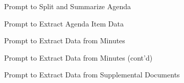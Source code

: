 \documentclass[12pt,english,hyperfootnotes=false,hidelinks]{article}
\begin{document}
\makeatletter
{}
\makeatother



\pagebreak

\begin{figure}[H]
\caption{Prompt to Split and Summarize Agenda} \label{fig_split_agenda_prompt}
\vspace{-0.5cm}
\begin{center}
\fbox{
\begin{minipage}{\textwidth}
\texttt{
\footnotesize

}
\end{minipage}
}
\end{center}
\end{figure}

\pagebreak

\begin{figure}[H]
\caption{Prompt to Extract Agenda Item Data} \label{fig_agenda_items_prompt}
\vspace{-0.6cm}
\begin{center}
\fbox{
\begin{minipage}{\textwidth}
\texttt{
\footnotesize

}
\end{minipage}
}
\end{center}
\end{figure}

\pagebreak

\begin{figure}[H]
\caption{Prompt to Extract Data from Minutes} \label{fig_minutes_prompt}
\vspace{-0.6cm}
\begin{center}
\fbox{
\begin{minipage}{\textwidth}
\texttt{
\footnotesize

}
\end{minipage}
}
\end{center}
\end{figure}

\pagebreak

\begin{figure}[H]\ContinuedFloat
\caption{Prompt to Extract Data from Minutes (cont'd)} \vspace{-0.6cm}
\begin{center}
\fbox{
\begin{minipage}{\textwidth}
\texttt{
\footnotesize

}
\end{minipage}
}
\end{center}
\end{figure}

\pagebreak

\begin{figure}[H]
\caption{Prompt to Extract Data from Supplemental Documents} \label{fig_supplemental_docs_prompt}
\vspace{-0.6cm}
\begin{center}
\fbox{
\begin{minipage}{\textwidth}
\texttt{
\footnotesize

}
\end{minipage}
}
\end{center}
\end{figure}
\end{document}
